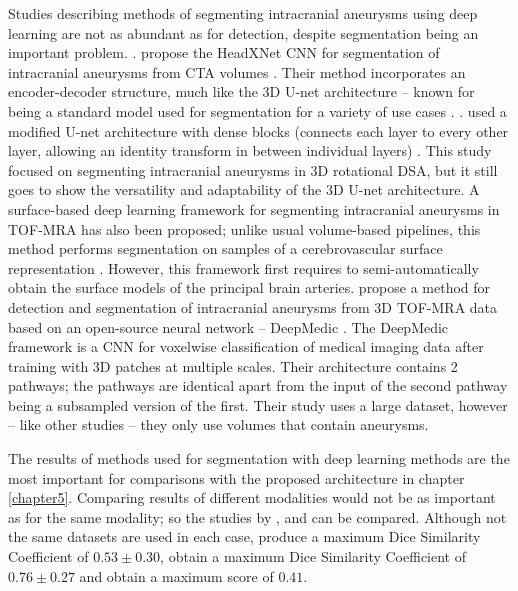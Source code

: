 Studies describing methods of segmenting intracranial aneurysms using deep learning are not as abundant as for detection, despite segmentation being an important problem. . \citeauthor{Park2019} propose the HeadXNet CNN for segmentation of intracranial aneurysms from CTA volumes \cite{Park2019}. Their method incorporates an encoder-decoder structure, much like the 3D U-net architecture -- known for being a standard model used for segmentation for a variety of use cases \cite{3dunet}. . \citeauthor{Liu2021} used a modified U-net architecture with dense blocks (connects each layer to every other layer, allowing an identity transform in between individual layers) \cite{Liu2021}. This study focused on segmenting intracranial aneurysms in 3D rotational DSA, but it still goes to show the versatility and adaptability  of the 3D U-net architecture. A surface-based deep learning framework for segmenting intracranial aneurysms in TOF-MRA has also been proposed; unlike usual volume-based pipelines, this method performs segmentation on samples of a cerebrovascular surface representation \cite{Yang2020}. However, this framework first requires to semi-automatically obtain the surface models of the principal brain arteries. \citeauthor{Sichermann2019} propose a method for detection and segmentation of intracranial aneurysms from 3D TOF-MRA data based on an open-source neural network --  DeepMedic \cite{Sichermann2019}. The DeepMedic framework is a CNN for voxelwise classification of medical imaging data after training with 3D patches at multiple scales. Their architecture contains 2 pathways; the pathways are identical apart from the input of the second pathway being a subsampled version of the first. Their study uses a large dataset, however -- like other studies -- they only use volumes that contain aneurysms. 

The results of methods used for segmentation with deep learning methods are the most important for comparisons with the proposed architecture in chapter \ref{chapter5}. Comparing results of different modalities would not be as important as for the same modality; so the studies by \citeauthor{Yang2020}, \citeauthor{Sichermann2019} and  can be compared. Although not the same datasets are used in each case, \citeauthor{Sichermann2019} produce a maximum Dice Similarity Coefficient of $0.53 \pm 0.30$, \citeauthor{Yang2020} obtain a maximum Dice Similarity Coefficient of $0.76 \pm 0.27$ and  obtain a maximum score of $0.41$. 


